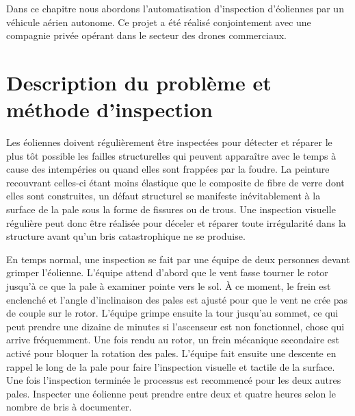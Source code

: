 \label{sec:uav}

Dans ce chapitre nous abordons l'automatisation d'inspection d'éoliennes par un véhicule aérien autonome. Ce projet a été réalisé conjointement avec une compagnie privée opérant dans le secteur des drones commerciaux.

\section{Description du problème et méthode d'inspection}

Les éoliennes doivent régulièrement être inspectées pour détecter et réparer le plus tôt possible les failles structurelles qui peuvent apparaître avec le temps à cause des intempéries ou quand elles sont frappées par la foudre. La peinture recouvrant celles-ci étant moins élastique que le composite de fibre de verre dont elles sont construites, un défaut structurel se manifeste inévitablement à la surface de la pale sous la forme de fissures ou de trous. Une inspection visuelle régulière peut donc être réalisée pour déceler et réparer toute irrégularité dans la structure avant qu'un bris catastrophique ne se produise.

En temps normal, une inspection se fait par une équipe de deux personnes devant grimper l'éolienne. L'équipe attend d'abord que le vent fasse tourner le rotor jusqu'à ce que la pale à examiner pointe vers le sol. À ce moment, le frein est enclenché et l'angle d'inclinaison des pales est ajusté pour que le vent ne crée pas de couple sur le rotor. L'équipe grimpe ensuite la tour jusqu'au sommet, ce qui peut prendre une dizaine de minutes si l'ascenseur est non fonctionnel, chose qui arrive fréquemment. Une fois rendu au rotor, un frein mécanique secondaire est activé pour bloquer la rotation des pales. L'équipe fait ensuite une descente en rappel le long de la pale pour faire l'inspection visuelle et tactile de la surface. Une fois l'inspection terminée le processus est recommencé pour les deux autres pales. Inspecter une éolienne peut prendre entre deux et quatre heures selon le nombre de bris à documenter.


